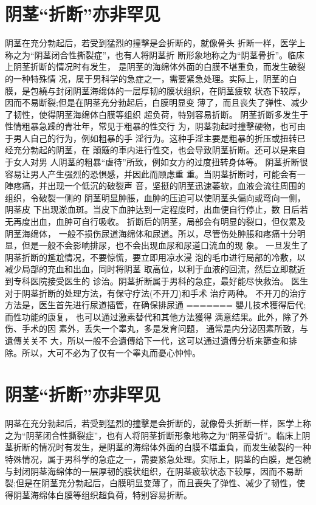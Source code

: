\documentclass[12pt,UTF8]{ctexbook}
\begin{document}
\section{阴茎“折断”亦非罕见}
阴茎在充分勃起后，若受到猛烈的撞擊是会折断的，就像骨头
折断一样，医学上称之为“阴茎闭合性撕裂症”，也有人将阴茎折
断形象地称之为“阴茎骨折”。临床上阴茎折断的情况时有发生，
是阴茎的海绵体外面的白膜不堪重负，而发生破裂的一种特殊情
况，属于男科学的急症之一，需要紧急处理。实际上，阴茎的白
膜，是包繞与封闭阴茎海绵体的一层厚韧的膜状组织，在阴茎疲软
状态下较厚，因而不易断裂;但是在阴茎充分勃起后，白膜明显变
薄了，而且丧失了弹性、减少了韧性，使得阴茎海绵体白膜等组织
超负荷，特别容易折断。
阴茎折断多发生于性情粗暴急躁的青壮年，常见于粗暴的性交行
为，阴茎勃起时撞擊硬物，也可由于男人自己的行为，例如粗暴的手
淫行为。这种手淫主要是粗暴的折压或扭转已经充分勃起的阴茎，在
顛簸的車内进行性交，也会导致阴茎折断。还可以是来自于女人对男
人阴茎的粗暴“虐待”所致，例如女方的过度扭转身体等。
阴茎折断很容易让男人产生强烈的恐惧感，并因此而顾虑重
重。当阴茎折断时，可能会有一陣疼痛，并出现一个低沉的破裂声
音，坚挺的阴茎迅速萎软，血液会流往周围的组织，令破裂一侧的
阴茎明显肿脹，血肿的压迫可以使阴茎头偏向或弯向一侧，阴茎皮
下出现淤血斑。当皮下血肿达到一定程度时，出血便自行停止，数
日后若无再度出血，血肿可自行吸收。
折断后的阴茎，局部会有明显的裂口，但仅累及阴茎海绵体，
一般不损伤尿道海绵体和尿道。所以，尽管伤处肿脹和疼痛十分明
显，但是一般不会影响排尿，也不会出现血尿和尿道口流血的现
象。
一旦发生了阴茎折断的尷尬情况，不要惊慌，要立即用凉水浸
泡的毛巾进行局部的冷敷，以减少局部的充血和出血，同时将阴茎
取高位，以利于血液的回流，然后立即就近到专科医院接受医生的
诊治。阴茎折断属于男科的急症，最好能尽快救治。
医生对于阴茎折断的处理方法，有保守疗法(不开刀)和手术
治疗两种。
不开刀的治疗方法是，医生首先进行尿道插管，在确保排尿通
=======
嬰儿技术獲得后代;而性功能的康复，
也可以通过激素替代和其他方法獲得
满意结果。此外，除了外伤、手术的因
素外，丢失一个睾丸，多是发育问題，
通常是内分泌因素所致，与遺傳关关不
大，所以一般不会遺傳给下一代，这可以通过遺傳分析来篩查和排
除。所以，大可不必为了仅有一个睾丸而憂心忡忡。

\section{阴茎“折断”亦非罕见}

阴茎在充分勃起后，若受到猛烈的撞擊是会折断的，就像骨头折断一样，医学上称之为“阴茎闭合性撕裂症”，也有人将阴茎折断形象地称之为“阴茎骨折”。临床上阴茎折断的情况时有发生，是阴茎的海绵体外面的白膜不堪重負，而发生破裂的一种特殊情况，属于男科学的急症之一，需要紧急处理。实际上，阴茎的白膜，是包繞与封闭阴茎海绵体的一层厚韧的膜状组织，在阴茎疲软状态下较厚，因而不易断裂;但是在阴茎充分勃起后，白膜明显变薄了，而且喪失了弹性、减少了韧性，使得阴茎海绵体白膜等组织超負荷，特别容易折断。
\end{document}
